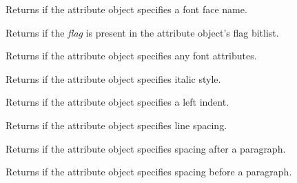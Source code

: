 
Returns \true if the attribute object specifies a font face name.

\label{wxrichtextattrhasflag}


Returns \true if the {\it flag} is present in the attribute object's flag bitlist.

\label{wxrichtextattrhasfont}


Returns \true if the attribute object specifies any font attributes.

\label{wxrichtextattrhasitalic}


Returns \true if the attribute object specifies italic style.

\label{wxrichtextattrhasleftindent}


Returns \true if the attribute object specifies a left indent.

\label{wxrichtextattrhaslinespacing}


Returns \true if the attribute object specifies line spacing.

\label{wxrichtextattrhasparagraphspacingafter}


Returns \true if the attribute object specifies spacing after a paragraph.

\label{wxrichtextattrhasparagraphspacingbefore}


Returns \true if the attribute object specifies spacing before a paragraph.

\label{wxrichtextattrhasparagraphstylename}


